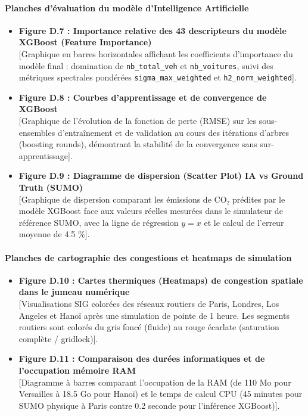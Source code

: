 \documentclass[10pt, a4paper]{article}
\providecommand{\tightlist}{}
\begin{document}
\paragraph{Planches d'évaluation du modèle d'Intelligence
Artificielle}\label{planches-duxe9valuation-du-moduxe8le-dintelligence-artificielle}

\begin{itemize}
\tightlist
\item
  \textbf{Figure D.7 : Importance relative des 43 descripteurs du modèle
  XGBoost (Feature Importance)}\\
  {[}Graphique en barres horizontales affichant les coefficients
  d'importance du modèle final : domination de \texttt{nb\_total\_veh}
  et \texttt{nb\_voitures}, suivi des métriques spectrales pondérées
  \texttt{sigma\_max\_weighted} et \texttt{h2\_norm\_weighted}{]}.
\item
  \textbf{Figure D.8 : Courbes d'apprentissage et de convergence de
  XGBoost}\\
  {[}Graphique de l'évolution de la fonction de perte (RMSE) sur les
  sous-ensembles d'entraînement et de validation au cours des itérations
  d'arbres (boosting rounds), démontrant la stabilité de la convergence
  sans sur-apprentissage{]}.
\item
  \textbf{Figure D.9 : Diagramme de dispersion (Scatter Plot) IA vs
  Ground Truth (SUMO)}\\
  {[}Graphique de dispersion comparant les émissions de CO₂ prédites par
  le modèle XGBoost face aux valeurs réelles mesurées dans le simulateur
  de référence SUMO, avec la ligne de régression \(y=x\) et le calcul de
  l'erreur moyenne de 4.5 \%{]}.
\end{itemize}

\paragraph{Planches de cartographie des congestions et heatmaps de
simulation}\label{planches-de-cartographie-des-congestions-et-heatmaps-de-simulation}

\begin{itemize}
\tightlist
\item
  \textbf{Figure D.10 : Cartes thermiques (Heatmaps) de congestion
  spatiale dans le jumeau numérique}\\
  {[}Visualisations SIG colorées des réseaux routiers de Paris, Londres,
  Los Angeles et Hanoï après une simulation de pointe de 1 heure. Les
  segments routiers sont colorés du gris foncé (fluide) au rouge
  écarlate (saturation complète / gridlock){]}.
\item
  \textbf{Figure D.11 : Comparaison des durées informatiques et de
  l'occupation mémoire RAM}\\
  {[}Diagramme à barres comparant l'occupation de la RAM (de 110 Mo pour
  Versailles à 18.5 Go pour Hanoï) et le temps de calcul CPU (45 minutes
  pour SUMO physique à Paris contre 0.2 seconde pour l'inférence
  XGBoost){]}.
\end{itemize}
\end{document}
